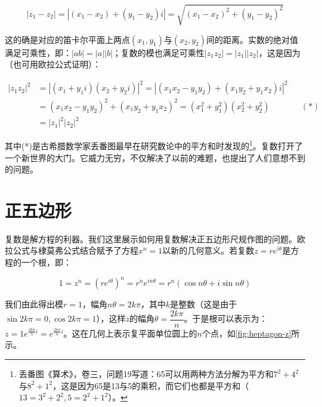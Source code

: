 \documentclass[b5paper]{ctexart}
\begin{document}
\[
|z_1 - z_2| = |(x_1 - x_2) + (y_1 - y_2)i| = \sqrt{(x_1 - x_2)^2 + (y_1 - y_2)^2}
\]

这的确是对应的笛卡尔平面上两点$(x_1, y_1)$与$(x_2, y_2)$间的距离。实数的绝对值满足可乘性，即：$|ab| = |a||b|$；复数的模也满足可乘性$|z_1z_2| = |z_1||z_2|$，这是因为（也可用欧拉公式证明）：

\begin{align*}
|z_1z_2|^2 &= |(x_1 + y_1i)(x_2 + y_2i)|^2 = |(x_1x_2 - y_1y_2) + (x_1y_2 + y_1x_2)i|^2 \\
  &= (x_1x_2 - y_1y_2)^2 + (x_1y_2 + y_1x_2)^2 = (x_1^2 + y_1^2)(x_2^2 + y_2^2) && (*) \\
  &= |z_1|^2|z_2|^2
\end{align*}

其中(*)是古希腊数学家丢番图最早在研究数论中的平方和时发现的\footnote{丢番图《算术》，卷三，问题19写道：65可以用两种方法分解为平方和$7^2 + 4^2$与$8^2 + 1^2$，这是因为65是13与5的乘积，而它们也都是平方和（$13 = 3^2 + 2^2, 5 = 2^2 + 1^2$）。}。复数打开了一个新世界的大门。它威力无穷，不仅解决了以前的难题，也提出了人们意想不到的问题。

\section{正五边形}
\label{sec:pentagon-equation} 

复数是解方程的利器。我们这里展示如何用复数解决正五边形尺规作图的问题。欧拉公式与棣莫弗公式结合赋予了方程$x^n = 1$以新的几何意义。若复数$z = re^{i\theta}$是方程的一个根，即：

\[
1 = z^n = (re^{i\theta})^n = r^ne^{in\theta} = r^n(\cos n\theta + i\sin n\theta)
\]

我们由此得出模$r = 1$，幅角$n\theta = 2k\pi$，其中$k$是整数（这是由于$\sin 2k\pi = 0, \cos 2k\pi = 1$），这样$z$的幅角$\theta = \dfrac{2k\pi}{n}$。于是根可以表示为：$z = 1e^{\frac{2k\pi}{n}i} = e^{\frac{2k\pi}{n}i}$。这在几何上表示复平面单位圆上的$n$个点，如\cref{fig:heptagon-z}所示。
\end{document}
